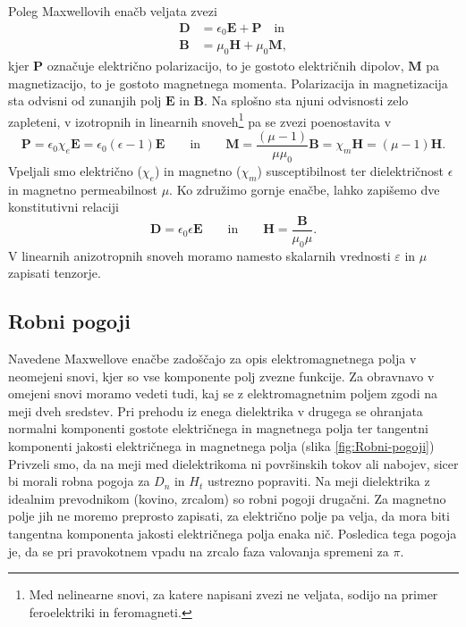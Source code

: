 Poleg Maxwellovih enačb veljata zvezi
\begin{align}
\mathbf{D} & =\epsilon_{0}\mathbf{E}+\mathbf{P} \quad \mathrm{in}\\
\mathbf{B} & =\mu_{0}\mathbf{H}+\mu_{0}\mathbf{M},
\end{align}
kjer $\mathbf{P}$ označuje električno
polarizacijo, to je gostoto električnih dipolov, $\mathbf{M}$
pa magnetizacijo, to je gostoto magnetnega momenta.
Polarizacija in magnetizacija sta odvisni od zunanjih polj $\mathbf{E}$
in $\mathbf{B}$. Na splošno sta njuni odvisnosti zelo zapleteni,
v izotropnih in linearnih snoveh\footnote{Med nelinearne snovi, za katere
napisani zvezi ne veljata, sodijo na primer feroelektriki in feromagneti.}
pa se zvezi poenostavita v 
\begin{equation}
\mathbf{P}=\epsilon_{0}\chi_e\mathbf{E} = \epsilon_{0}(\epsilon-1)\mathbf{E} \qquad \textrm{in} 
\qquad
\mathbf{M}=\frac{(\mu-1)}{\mu\mu_0}\mathbf{B} = \chi_m \mathbf{H} = (\mu-1)\mathbf{H}
\label{eq:PM}.
\end{equation}
Vpeljali smo  električno ($\chi_e$) in 
magnetno ($\chi_m$) susceptibilnost ter
dielektričnost $\epsilon$ in
magnetno permeabilnost $\mu$. Ko združimo gornje
enačbe, lahko zapišemo dve konstitutivni
relaciji
\begin{equation}
\mathbf{D}  =\epsilon_{0}\epsilon\mathbf{E}\qquad \textrm{in} 
\qquad
\mathbf{H}  =\frac{\mathbf{B}}{\mu_{0}\mu}.
\end{equation}
V linearnih anizotropnih snoveh moramo namesto skalarnih vrednosti $\varepsilon$
in $\mu$ zapisati tenzorje. 

\subsection*{Robni pogoji}
Navedene Maxwellove enačbe zadoščajo za opis elektromagnetnega polja
v neomejeni snovi, kjer so vse komponente polj zvezne funkcije. Za
obravnavo v omejeni snovi moramo vedeti tudi, kaj se z elektromagnetnim
poljem zgodi na meji dveh sredstev. Pri prehodu
iz enega dielektrika v drugega se ohranjata normalni komponenti gostote
električnega in magnetnega polja ter tangentni komponenti jakosti
električnega in magnetnega polja (slika \ref{fig:Robni-pogoji}) 
Privzeli smo, da na meji med dielektrikoma ni površinskih
tokov ali nabojev, sicer bi morali robna pogoja za $D_n$ in $H_t$
ustrezno popraviti. Na meji dielektrika z idealnim prevodnikom (kovino,
zrcalom) so robni pogoji drugačni. Za magnetno polje jih ne moremo
preprosto zapisati, za električno polje pa velja, da mora biti tangentna
komponenta jakosti električnega polja enaka nič. Posledica tega 
pogoja je, da se pri pravokotnem vpadu na zrcalo faza valovanja
spremeni za $\pi$. 

